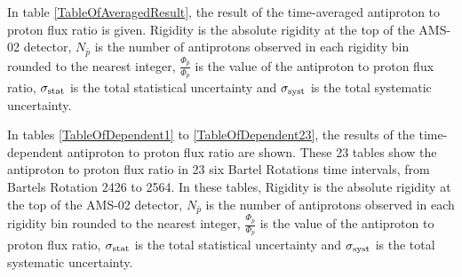 

In table \ref{TableOfAveragedResult}, the result of the time-averaged antiproton to proton flux ratio is given. Rigidity is the absolute rigidity at the top of the AMS-02 detector, $N_{\bar{p}}$ is the number of antiprotons observed in each rigidity bin rounded to the nearest integer, $\frac{\Phi_{\bar{p}}}{\Phi_{p}}$ is the value of the antiproton to proton flux ratio, $\sigma_{\rm{stat}}$ is the total statistical uncertainty and $\sigma_{\rm{syst}}$ is the total systematic uncertainty. \par

In tables \ref{TableOfDependent1} to \ref{TableOfDependent23}, the results of the time-dependent antiproton to proton flux ratio are shown. These 23 tables show the antiproton to proton flux ratio in 23 six Bartel Rotations time intervals, from Bartels Rotation 2426 to 2564. In these tables, Rigidity is the absolute rigidity at the top of the AMS-02 detector, $N_{\bar{p}}$ is the number of antiprotons observed in each rigidity bin rounded to the nearest integer, $\frac{\Phi_{\bar{p}}}{\Phi_{p}}$ is the value of the antiproton to proton flux ratio, $\sigma_{\rm{stat}}$ is the total statistical uncertainty and $\sigma_{\rm{syst}}$ is the total systematic uncertainty.      \par



